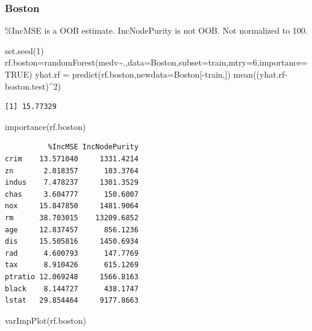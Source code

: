 \documentclass[
  letterpaper,
  DIV=11,
  numbers=noendperiod]{scrartcl}
\newenvironment{Shaded}{\begin{snugshade}}{\end{snugshade}}
\newcommand{\AttributeTok}[1]{\textcolor[rgb]{0.40,0.45,0.13}{#1}}
\newcommand{\ConstantTok}[1]{\textcolor[rgb]{0.56,0.35,0.01}{#1}}
\newcommand{\DecValTok}[1]{\textcolor[rgb]{0.68,0.00,0.00}{#1}}
\newcommand{\FunctionTok}[1]{\textcolor[rgb]{0.28,0.35,0.67}{#1}}
\newcommand{\NormalTok}[1]{\textcolor[rgb]{0.00,0.23,0.31}{#1}}
\newcommand{\OtherTok}[1]{\textcolor[rgb]{0.00,0.23,0.31}{#1}}
\newcommand{\SpecialCharTok}[1]{\textcolor[rgb]{0.37,0.37,0.37}{#1}}
\begin{document}
\hypertarget{boston}{%
\subsubsection{Boston}\label{boston}}

\%IncMSE is a OOB estimate. IncNodePurity is not OOB. Not normalized to
100.

\begin{Shaded}
\begin{Highlighting}[]
\FunctionTok{set.seed}\NormalTok{(}\DecValTok{1}\NormalTok{)}
\NormalTok{rf.boston}\OtherTok{=}\FunctionTok{randomForest}\NormalTok{(medv}\SpecialCharTok{\textasciitilde{}}\NormalTok{.,}\AttributeTok{data=}\NormalTok{Boston,}\AttributeTok{subset=}\NormalTok{train,}\AttributeTok{mtry=}\DecValTok{6}\NormalTok{,}\AttributeTok{importance=}\ConstantTok{TRUE}\NormalTok{)}
\NormalTok{yhat.rf }\OtherTok{=} \FunctionTok{predict}\NormalTok{(rf.boston,}\AttributeTok{newdata=}\NormalTok{Boston[}\SpecialCharTok{{-}}\NormalTok{train,])}
\FunctionTok{mean}\NormalTok{((yhat.rf}\SpecialCharTok{{-}}\NormalTok{boston.test)}\SpecialCharTok{\^{}}\DecValTok{2}\NormalTok{)}
\end{Highlighting}
\end{Shaded}

\begin{verbatim}
[1] 15.77329
\end{verbatim}

\begin{Shaded}
\begin{Highlighting}[]
\FunctionTok{importance}\NormalTok{(rf.boston)}
\end{Highlighting}
\end{Shaded}

\begin{verbatim}
          %IncMSE IncNodePurity
crim    13.571040     1331.4214
zn       2.018357      103.3764
indus    7.478237     1301.3529
chas     3.604777      150.6007
nox     15.847850     1481.9064
rm      38.703015    13209.6852
age     12.837457      856.1236
dis     15.505816     1450.6934
rad      4.600793      147.7769
tax      8.910426      615.1269
ptratio 12.069248     1566.8163
black    8.144727      438.1747
lstat   29.854464     9177.8663
\end{verbatim}

\begin{Shaded}
\begin{Highlighting}[]
\FunctionTok{varImpPlot}\NormalTok{(rf.boston)}
\end{Highlighting}
\end{Shaded}
\end{document}
